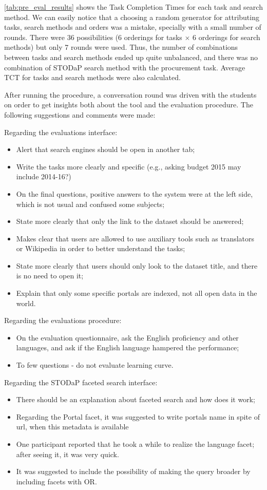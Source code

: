 \autoref{tab:pre_eval_results} shows the Task Completion Times for each task and search method.
We can easily notice that a choosing a random generator for attributing tasks, search methods and orders was a mistake, specially with a small number of rounds.
There were 36 possibilities (6 orderings for tasks $\times$ 6 orderings for search methods) but only 7 rounds were used.
Thus, the number of combinations between tasks and search methods ended up quite unbalanced, and there was no combination of STODaP search method with the procurement task.
Average TCT for tasks and search methods were also calculated.

After running the procedure, a conversation round was driven with the students on order to get insights both about the tool and the evaluation procedure.
The following suggestions and comments were made:

Regarding the evaluations interface:

\begin{itemize}
	\item Alert that search engines should be open in another tab;
	\item Write the tasks more clearly and specific (e.g., asking budget 2015 may include 2014-16?)
	\item On the final questions, positive answers to the system were at the left side, which is not usual and confused some subjects;
	\item State more clearly that only the link to the dataset should be answered;
	\item Makes clear that users are allowed to use auxiliary tools such as translators or Wikipedia in order to better understand the tasks;
	\item State more clearly that users should only look to the dataset title, and there is no need to open it;
	\item Explain that only some specific portals are indexed, not all open data in the world.
\end{itemize}

Regarding the evaluations procedure:
\begin{itemize}
	\item On the evaluation questionnaire, ask the English proficiency and other languages, and ask if the English language hampered the performance;
	\item To few questions - do not evaluate learning curve.
\end{itemize}
	
Regarding the STODaP faceted search interface:
\begin{itemize}
	\item There should be an explanation about faceted search and how does it work;
	\item Regarding the Portal facet, it was suggested to write portals name in spite of url, when this metadata is available
	\item One participant reported that he took a while to realize the language facet; after seeing it, it was very quick.
	\item It was suggested to include the possibility of making the query broader by including facets with OR.
\end{itemize}	

